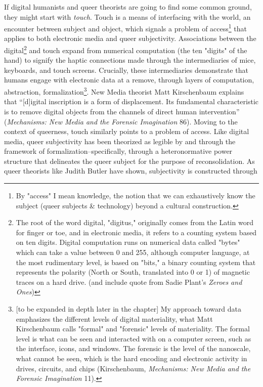 \documentclass[11pt]{article}
\begin{document}
If digital humanists and queer theorists are going to find some common
ground, they might start with \emph{touch}. Touch is a means of interfacing
with the world, an encounter between subject and object, which signals
a problem of access\footnote{By "access" I mean knowledge, the notion that we can
exhaustively know the subject (queer subjects \& technology) beyond a
cultural construction.} that applies to both electronic media and
queer subjectivity. Associations between the digital\footnote{The root of the word digital, "digitus," originally comes from
the Latin word for finger or toe, and in electronic media, it refers
to a counting system based on ten digits. Digital computation runs on
numerical data called "bytes" which can take a value between 0 and
255, although computer language, at the most rudimentary level, is
based on "bits," a binary counting system that represents the polarity
(North or South, translated into 0 or 1) of magnetic traces on a hard
drive. (and include quote from Sadie Plant's \emph{Zeroes and Ones})} and touch
expand from numerical computation (the ten "digits" of the hand) to
signify the haptic connections made through the intermediaries of
mice, keyboards, and touch screens. Crucially, these intermediaries
demonstrate that humans engage with electronic data at a remove,
through layers of computation, abstraction, formalization\footnote{[to be expanded in depth later in the chapter] My approach
toward data emphasizes the different levels of digital materiality,
what Matt Kirschenbaum calls "formal" and "forensic" levels of
materiality. The formal level is what can be seen and interacted with
on a computer screen, such as the interface, icons, and windows. The
forensic is the level of the nanoscale, what cannot be seen, which is
the hard encoding and electronic activity in drives, circuits, and
chips (Kirschenbaum, \emph{Mechanisms: New Media and the Forensic
Imagination} 11).}. New
Media theorist Matt Kirschenbaum explains that “[d]igital inscription
is a form of displacement. Its fundamental characteristic is to remove
digital objects from the channels of direct human intervention”
(\emph{Mechanisms: New Media and the Forensic Imagination} 86). Moving to
the context of queerness, touch similarly points to a problem of
access. Like digital media, queer subjectivity has been theorized as
legible by and through the framework of formalization--specifically,
through a heteronormative power structure that delineates the queer
subject for the purpose of reconsolidation. As queer theorists like
Judith Butler have shown, subjectivity is constructed through
\end{document}
